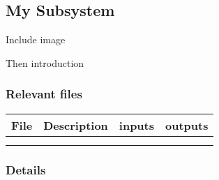 \subsection{My Subsystem}

Include image

Then introduction

\subsubsection{Relevant files}
\begin{tabular}{|l|l|l|l|}
\hline File  & Description & inputs & outputs \\ 
\hline  &  &  &  \\ 
\hline  &  &  &  \\ 
\hline 
\end{tabular} 

\subsubsection{Details}